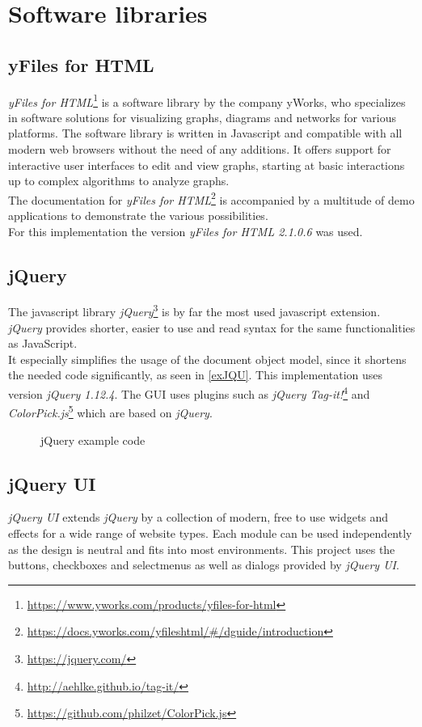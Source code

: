 \section{Software libraries}
\subsection{yFiles for HTML}
\textit{yFiles for HTML}\footnote{\url{https://www.yworks.com/products/yfiles-for-html}} is a software library by the company yWorks, who specializes in software solutions for visualizing graphs, diagrams and networks for various platforms.
The software library is written in Javascript and compatible with all modern web browsers without the need of any additions. It offers support for interactive user interfaces to edit and view graphs, starting at basic interactions up to complex algorithms to analyze graphs.\\
The documentation for \textit{yFiles for HTML}\footnote{\url{https://docs.yworks.com/yfileshtml/\#/dguide/introduction}} is accompanied by a multitude of demo applications to demonstrate the various possibilities.\\
For this implementation the version \textit{yFiles for HTML 2.1.0.6} was used.
\subsection{jQuery}
The javascript library \textit{jQuery}\footnote{\url{https://jquery.com/}} is by far the most used javascript extension. \textit{jQuery} provides shorter, easier to use and read syntax for the same functionalities as JavaScript.\\
It especially simplifies the usage of the document object model, since it shortens the needed code significantly, as seen in \autoref{exJQU}.
This implementation uses version \textit{jQuery 1.12.4}. The GUI uses plugins such as \textit{jQuery Tag-it!}\footnote{\url{http://aehlke.github.io/tag-it/}} and \textit{ColorPick.js}\footnote{\url{https://github.com/philzet/ColorPick.js}} which are based on \textit{jQuery}.
\begin{figure}[!h]

\caption{jQuery example code}
\label{exJQU}
\end{figure}
\subsection{jQuery UI}
\textit{jQuery UI} extends \textit{jQuery} by a collection of modern, free to use widgets and effects for a wide range of website types. Each module can be used independently as the design is neutral and fits into most environments. This project uses the buttons, checkboxes and selectmenus as well as dialogs provided by \textit{jQuery UI}.

\clearpage
